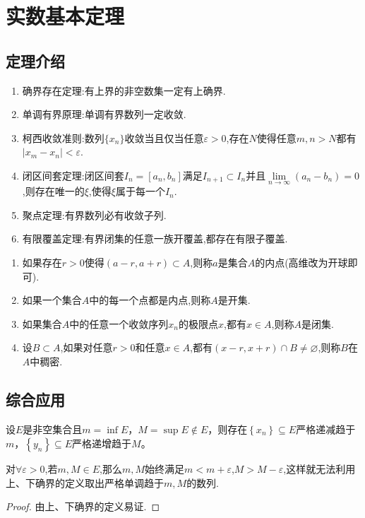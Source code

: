 \documentclass[../../main.tex]{subfiles}%
\begin{document}
\section{实数基本定理}

\subsection{定理介绍}

\begin{theorem}[实数基本定理]\label{theorem:实数基本定理}
\begin{enumerate}
\item 确界存在定理:有上界的非空数集一定有上确界.
\item 单调有界原理:单调有界数列一定收敛.
\item 柯西收敛准则:数列\(\{x_n\}\)收敛当且仅当任意\(\varepsilon > 0\),存在\(N\)使得任意\(m,n > N\)都有\(\vert x_m - x_n\vert < \varepsilon\).
\item 闭区间套定理:闭区间套\(I_n = [a_n,b_n]\)满足\(I_{n + 1} \subset I_n\)并且\(\lim\limits_{n \to \infty} (a_n - b_n) = 0\),则存在唯一的\(\xi\),使得\(\xi\)属于每一个\(I_n\).
\item 聚点定理:有界数列必有收敛子列.
\item 有限覆盖定理:有界闭集的任意一族开覆盖,都存在有限子覆盖.
\end{enumerate}
\end{theorem}

\begin{definition}[点集相关概念]\label{definition:点集相关概念}
\begin{enumerate}
\item 如果存在\(r > 0\)使得\((a - r,a + r) \subset A\),则称\(a\)是集合\(A\)的内点(高维改为开球即可).
\item 如果一个集合\(A\)中的每一个点都是内点,则称\(A\)是开集.
\item 如果集合\(A\)中的任意一个收敛序列\(x_n\)的极限点\(x\),都有\(x\in A\),则称\(A\)是闭集.
\item 设\(B\subset A\),如果对任意\(r > 0\)和任意\(x\in A\),都有\((x - r,x + r)\cap B\neq\varnothing\),则称\(B\)在\(A\)中稠密.
\end{enumerate}
\end{definition}

\subsection{综合应用}

\begin{proposition}\label{proposition:确界不在集合中必存在严格单调数列}
设$E$是非空集合且$m=\inf\limits_{}E$，$M=\sup\limits_{}E\notin E$，则存在$\left\{ x_n \right\} \subseteq E$严格递减趋于$m$，$\left\{ y_n \right\} \subseteq E$严格递增趋于$M$。
\end{proposition}
\begin{note}
对$\forall \varepsilon>0$,若$m,M\in E$,那么$m,M$始终满足$m<m+\varepsilon$,$M>M-\varepsilon$,这样就无法利用上、下确界的定义取出严格单调趋于$m,M$的数列.
\end{note}
\begin{proof}
由上、下确界的定义易证.
\end{proof}
\end{document}
